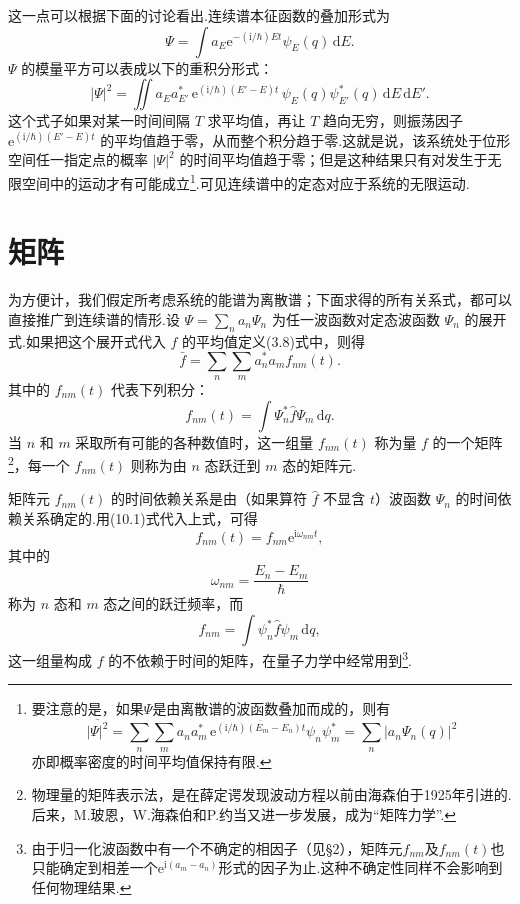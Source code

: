 这一点可以根据下面的讨论看出.连续谱本征函数的叠加形式为
\begin{equation*}
  \varPsi=\int a_E\mathrm{e}^{-(\mathrm{i}/\hbar)Et}\psi_E(q)\,\mathrm{d}E.
\end{equation*}
$\varPsi$ 的模量平方可以表成以下的重积分形式：
\begin{equation*}
  |\varPsi|^{2}=\iint a_Ea_{E'}^{*}\,
  \mathrm{e}^{(\mathrm{i}/\hbar)(E'-E)t}\,
  \psi_E(q)\psi_{E'}^{*}(q)\,\mathrm{d}E\,\mathrm{d}E'.
\end{equation*}
这个式子如果对某一时间间隔 $T$ 求平均值，再让 $T$ 趋向无穷，则振荡因子 $\mathrm{e}^{(\mathrm{i}/\hbar)(E'-E)t}$ 的平均值趋于零，从而整个积分趋于零.这就是说，该系统处于位形空间任一指定点的概率 $|\varPsi|^{2}$ 的时间平均值趋于零；但是这种结果只有对发生于无限空间中的运动才有可能成立\footnote{要注意的是，如果$\varPsi$是由离散谱的波函数叠加而成的，则有
\begin{equation*}
  \overline{|\varPsi|^{2}}=\sum_n\sum_m a_na_m^{*}\,
  \mathrm{e}^{\overline{(\mathrm{i}/\hbar)(E_m-E_n)t}}\psi_n\psi_m^{*}
  =\sum_n|a_n\varPsi_n(q)|^{2}
\end{equation*}
亦即概率密度的时间平均值保持有限.}.可见连续谱中的定态对应于系统的无限运动.

\section{矩阵}

为方便计，我们假定所考虑系统的能谱为离散谱；下面求得的所有关系式，都可以直接推广到连续谱的情形.设 $\varPsi=\sum_n a_n\varPsi_n$ 为任一波函数对定态波函数 $\varPsi_n$ 的展开式.如果把这个展开式代入 $f$ 的平均值定义(3.8)式中，则得
\begin{equation}
  \bar{f}=\sum_n\sum_m a_n^{*}a_mf_{nm}(t).
\end{equation}
其中的 $f_{nm}(t)$ 代表下列积分：
\begin{equation}
  f_{nm}(t)=\int\varPsi_n^{*}\hat{f}\varPsi_m\,\mathrm{d}q.
\end{equation}
当 $n$ 和 $m$ 采取所有可能的各种数值时，这一组量 $f_{nm}(t)$ 称为量 $f$ 的一个矩阵\footnote{物理量的矩阵表示法，是在薛定谔发现波动方程以前由海森伯于1925年引进的.后来，M.玻恩，W.海森伯和P.约当又进一步发展，成为“矩阵力学”.}，每一个 $f_{nm}(t)$ 则称为由 $n$ 态跃迁到 $m$ 态的矩阵元.

矩阵元 $f_{nm}(t)$ 的时间依赖关系是由（如果算符 $\hat{f}$ 不显含 $t$）波函数 $\varPsi_n$ 的时间依赖关系确定的.用(10.1)式代入上式，可得
\begin{equation}
  f_{nm}(t)=f_{nm}\mathrm{e}^{\mathrm{i}\omega_{nm}t},
\end{equation}
其中的
\begin{equation}
  \omega_{nm}=\frac{E_n-E_m}{\hbar}
\end{equation}
称为 $n$ 态和 $m$ 态之间的跃迁频率，而
\begin{equation}
  f_{nm}=\int\psi_n^{*}\hat{f}\psi_m\,\mathrm{d}q,
\end{equation}
这一组量构成 $f$ 的不依赖于时间的矩阵，在量子力学中经常用到\footnote{由于归一化波函数中有一个不确定的相因子（见§2），矩阵元$f_{nm}$及$f_{nm}(t)$也只能确定到相差一个$\mathrm{e}^{\mathrm{i}(a_m-a_n)}$形式的因子为止.这种不确定性同样不会影响到任何物理结果.}.

